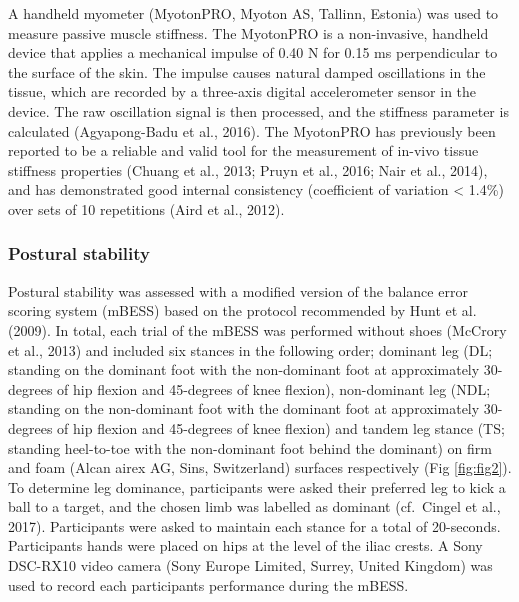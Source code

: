 \documentclass[
  english,
  man,floatsintext]{apa6}
\begin{document}
A handheld myometer (MyotonPRO, Myoton AS, Tallinn, Estonia) was used to measure passive muscle stiffness.
The MyotonPRO is a non-invasive, handheld device that applies a mechanical impulse of 0.40 N for 0.15 ms perpendicular to the surface of the skin.
The impulse causes natural damped oscillations in the tissue, which are recorded by a three-axis digital accelerometer sensor in the device.
The raw oscillation signal is then processed, and the stiffness parameter is calculated (Agyapong-Badu et al., 2016).
The MyotonPRO has previously been reported to be a reliable and valid tool for the measurement of in-vivo tissue stiffness properties (Chuang et al., 2013; Pruyn et al., 2016; Nair et al., 2014), and has demonstrated good internal consistency (coefficient of variation \textless{} 1.4\%) over sets of 10 repetitions (Aird et al., 2012).

\hypertarget{postural-stability}{%
\subsubsection{Postural stability}\label{postural-stability}}

Postural stability was assessed with a modified version of the balance error scoring system (mBESS) based on the protocol recommended by Hunt et al. (2009).
In total, each trial of the mBESS was performed without shoes (McCrory et al., 2013) and included six stances in the following order; dominant leg (DL; standing on the dominant foot with the non-dominant foot at approximately 30-degrees of hip flexion and 45-degrees of knee flexion),
non-dominant leg (NDL; standing on the non-dominant foot with the dominant foot at approximately 30-degrees of hip flexion and 45-degrees of knee flexion)
and tandem leg stance (TS; standing heel-to-toe with the non-dominant foot behind the dominant) on firm and foam (Alcan airex AG, Sins, Switzerland) surfaces respectively (Fig \ref{fig:fig2}).
To determine leg dominance, participants were asked their preferred leg to kick a ball to a target, and the chosen limb was labelled as dominant (cf.~Cingel et al., 2017).
Participants were asked to maintain each stance for a total of 20-seconds.
Participants hands were placed on hips at the level of the iliac crests.
A Sony DSC-RX10 video camera (Sony Europe Limited, Surrey, United Kingdom) was used to record each participants performance during the mBESS.
\end{document}
